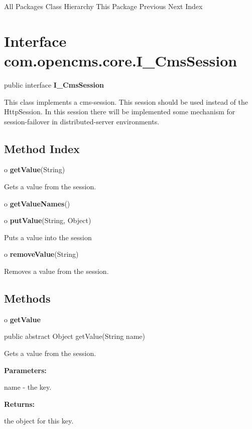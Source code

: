 \begin{PRE}
All Packages  Class Hierarchy  This Package  Previous  Next  Index
\end{PRE}

\htmlHR

\section{  Interface com.opencms.core.I\_CmsSession }

\begin{description}
\item public interface {\bf I\_CmsSession} 
\end{description}

This class implements a cms-session. This session should be used instead of
the HttpSession. In this session there will be implemented some mechanism for
session-failover in distributed-server environments. 

\htmlHR

\subsection*{  Method Index }

\begin{description}
\item o {\bf getValue}(String)  

Gets a value from the session.  
\item o {\bf getValueNames}()  

\item o {\bf putValue}(String, Object)  

Puts a value into the session  
\item o {\bf removeValue}(String)  

Removes a value from the session. 
\end{description}

\subsection*{  Methods }

o {\bf getValue} 

\begin{PRE}
 public abstract Object getValue(String name)
\end{PRE}

\begin{description}
\htmlDD Gets a value from the session. 

\begin{description}
\item {\bf Parameters:}  

name - the key.  
\item {\bf Returns:}  

the object for this key.  
\end{description}

\end{description}

